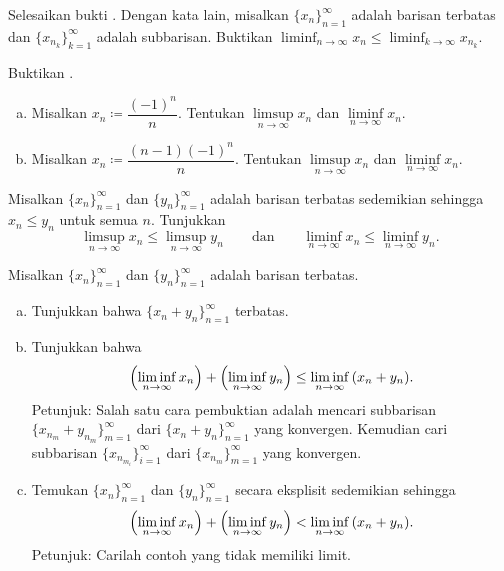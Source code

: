 \begin{exercise}
Selesaikan bukti .  Dengan kata lain,
misalkan $\{ x_n \}_{n=1}^\infty$ adalah barisan terbatas dan
$\{ x_{n_k} \}_{k=1}^\infty$ adalah subbarisan.  Buktikan
$\displaystyle \liminf_{n\to\infty} x_n \leq
\liminf_{k\to\infty} x_{n_k}$.
\end{exercise}

\begin{exercise}
Buktikan .
\end{exercise}

\begin{exercise}
\leavevmode
\begin{enumerate}[a)]
\item
Misalkan $x_n \coloneqq \dfrac{{(-1)}^n}{n}$.
Tentukan $\limsup\limits_{n\to\infty} x_n$ dan $\liminf\limits_{n\to\infty} x_n$.
\item
Misalkan $x_n \coloneqq \dfrac{(n-1){(-1)}^n}{n}$.
Tentukan $\limsup\limits_{n\to\infty} x_n$ dan $\liminf\limits_{n\to\infty} x_n$.
\end{enumerate}
\end{exercise}

\begin{exercise}
Misalkan $\{ x_n \}_{n=1}^\infty$ dan $\{ y_n \}_{n=1}^\infty$ adalah barisan terbatas sedemikian sehingga
$x_n \leq y_n$ untuk semua $n$.  Tunjukkan
\begin{equation*}
\limsup_{n\to\infty} x_n \leq
\limsup_{n\to\infty} y_n
\qquad \text{dan} \qquad
\liminf_{n\to\infty} x_n \leq
\liminf_{n\to\infty} y_n .
\end{equation*}
\end{exercise}

\begin{exercise}
Misalkan $\{ x_n \}_{n=1}^\infty$ dan $\{ y_n \}_{n=1}^\infty$ adalah barisan terbatas.
\begin{enumerate}[a)]
\item
Tunjukkan bahwa $\{ x_n + y_n \}_{n=1}^\infty$ terbatas.
\item
Tunjukkan bahwa
\begin{equation*}
\Bigl(\liminf_{n\to \infty} x_n\Bigr)
+
\Bigl(\liminf_{n\to \infty} y_n\Bigr)
\leq
\liminf_{n\to \infty} \, (x_n+y_n) .
\end{equation*}
Petunjuk: Salah satu cara pembuktian adalah mencari subbarisan $\{ x_{n_m}+y_{n_m} \}_{m=1}^\infty$ dari
$\{ x_n + y_n \}_{n=1}^\infty$ yang konvergen.
Kemudian cari subbarisan $\{ x_{n_{m_i}} \}_{i=1}^\infty$ dari
$\{ x_{n_m} \}_{m=1}^\infty$ yang konvergen.
\item
Temukan $\{ x_n \}_{n=1}^\infty$ dan $\{ y_n \}_{n=1}^\infty$ secara eksplisit sedemikian sehingga
\begin{equation*}
\Bigl(\liminf_{n\to \infty} x_n\Bigr)
+
\Bigl(\liminf_{n\to \infty} y_n\Bigr)
<
\liminf_{n\to \infty} \, (x_n+y_n) .
\end{equation*}
Petunjuk: Carilah contoh yang tidak memiliki limit.
\end{enumerate}
\end{exercise}

